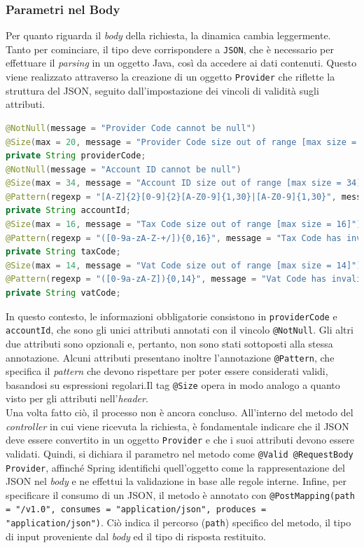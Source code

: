\subsubsection{Parametri nel Body}
Per quanto riguarda il \textit{body} della richiesta, la dinamica cambia leggermente. Tanto per cominciare, il tipo deve corrispondere a \texttt{JSON}, che è necessario per effettuare il \textit{parsing} in un oggetto Java, così da accedere ai dati contenuti. Questo viene realizzato attraverso la creazione di un oggetto \texttt{Provider} che riflette la struttura del JSON, seguito dall’impostazione dei vincoli di validità sugli attributi.
\begin{lstlisting}[language=Java, caption=Dichiarazione dei vincoli di validità per i dati contenuti nel \textit{body} della richiesta.]
@NotNull(message = "Provider Code cannot be null")
@Size(max = 20, message = "Provider Code size out of range [max size = 20]")
private String providerCode;
@NotNull(message = "Account ID cannot be null")
@Size(max = 34, message = "Account ID size out of range [max size = 34]")
@Pattern(regexp = "[A-Z]{2}[0-9]{2}[A-Z0-9]{1,30}|[A-Z0-9]{1,30}", message = "Account ID has invalid format")
private String accountId;
@Size(max = 16, message = "Tax Code size out of range [max size = 16]")
@Pattern(regexp = "([0-9a-zA-Z-+/]){0,16}", message = "Tax Code has invalid format")
private String taxCode;
@Size(max = 14, message = "Vat Code size out of range [max size = 14]")
@Pattern(regexp = "([0-9a-zA-Z]){0,14}", message = "Vat Code has invalid format")
private String vatCode;
\end{lstlisting}
In questo contesto, le informazioni obbligatorie consistono in \texttt{providerCode} e \texttt{accountId}, che sono gli unici attributi annotati con il vincolo \texttt{@NotNull}. Gli altri due attributi sono opzionali e, pertanto, non sono stati sottoposti alla stessa annotazione. Alcuni attributi presentano inoltre l’annotazione \texttt{@Pattern}, che specifica il \textit{pattern} che devono rispettare per poter essere considerati validi, basandosi su espressioni regolari.Il tag \texttt{@Size} opera in modo analogo a quanto visto per gli attributi nell’\textit{header}.\\
Una volta fatto ciò, il processo non è ancora concluso. All’interno del metodo del \textit{controller} in cui viene ricevuta la richiesta, è fondamentale indicare che il JSON deve essere convertito in un oggetto \texttt{Provider} e che i suoi attributi devono essere validati. Quindi, si dichiara il parametro nel metodo come \texttt{@Valid @RequestBody Provider}, affinché Spring identifichi quell’oggetto come la rappresentazione del JSON nel \textit{body} e ne effettui la validazione in base alle regole interne. Infine, per specificare il consumo di un JSON, il metodo è annotato con \texttt{@PostMapping(path = "/v1.0", consumes = "application/json", produces = "application/json")}. Ciò indica il percorso (\texttt{path}) specifico del metodo, il tipo di input proveniente dal \textit{body} ed il tipo di risposta restituito.


